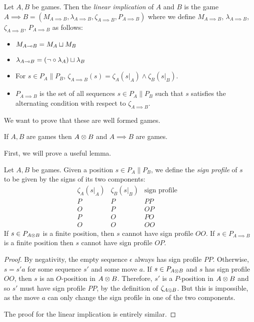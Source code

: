 \documentclass{entcs} \usepackage{prentcsmacro}
\newcommand{\0}{{\mathtt{0}}}
\begin{document}
\begin{definition}
  Let $A,B$ be games.  Then the \emph{linear implication} of $A$ and $B$ is the game $A\implies B=(M_{A\implies B}, \lambda_{A\implies B}, \zeta_{A\implies B}, P_{A\implies B})$ where we define $M_{A\implies B}$, $\lambda_{A\implies B}$, $\zeta_{A\implies B}$, $P_{A\implies B}$ as follows:
  \begin{itemize}
    \item $M_{A\multimap B} = M_A \sqcup M_B$
    \item $\lambda_{A\multimap B} = (\neg\circ\lambda_A) \sqcup \lambda_B$
    \item For $s\in P_A\|P_B$, $\zeta_{A\implies B}(s) = \zeta_A(s\vert_A) \wedge \zeta_B(s\vert_B)$.
    \item $P_{A\implies B}$ is the set of all sequences $s\in P_A\|P_B$ such that $s$ satisfies the alternating condition with respect to $\zeta_{A\implies B}$.  
  \end{itemize}
\end{definition}

We want to prove that these are well formed games.

\begin{proposition}\label{TensorImpliesWellFormed}
  If $A,B$ are games then $A\otimes B$ and $A\implies B$ are games.
\end{proposition}

First, we will prove a useful lemma.

\begin{lemma}\label{signProfilesLemma}
  Let $A,B$ be games.  Given a position $s\in P_A\|P_B$, we define the \emph{sign profile} of $s$ to be given by the signs of its two components:
  \[
    \begin{array}{cc|c}
      \zeta_A(s\vert_A) & \zeta_B(s\vert_B) & \textrm{sign profile} \\
      \hline
      P & P & PP \\
      O & P & OP \\
      P & O & PO \\
      O & O & OO
    \end{array}
    \]
  If $s\in P_{A\otimes B}$ is a finite position, then $s$ cannot have sign profile $OO$.  If $s\in P_{A\implies B}$ is a finite position then $s$ cannot have sign profile $OP$.  
\end{lemma}
\begin{proof}
  By negativity, the empty sequence $\epsilon$ always has sign profile $PP$.  Otherwise, $s=s'a$ for some sequence $s'$ and some move $a$.  If $s\in P_{A\otimes B}$ and $s$ has sign profile $OO$, then $s$ is an $O$-position in $A\otimes B$.  Therefore, $s'$ is a $P$-position in $A\otimes B$ and so $s'$ must have sign profile $PP$, by the definition of $\zeta_{A\otimes B}$.  But this is impossible, as the move $a$ can only change the sign profile in one of the two components.  

  The proof for the linear implication is entirely similar.
\end{proof}
\end{document}
